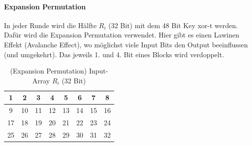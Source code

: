 \paragraph{Expansion Permutation}

In jeder Runde wird die Hälfte $R_i$ (32 Bit) mit dem 48 Bit Key xor-t werden. Dafür wird die Expansion Permutation  verwendet. Hier gibt
es einen Lawinen Effekt (Avalanche Effect), wo möglichst viele Input Bits den Output beeinflussen (und umgekehrt). Das jeweils 1. und 4. Bit eines Blocks wird verdoppelt.

\begin{table}[h]
    \centering
    \begin{tabular}{|*{8}{c|}}
        \hline
        \cellcolor{red-1}1 & \cellcolor{red-1}2 & \cellcolor{red-1}3 & \cellcolor{red-1}4 & 
        \cellcolor{red-1}5 & \cellcolor{red-1}6 & \cellcolor{red-1}7 & \cellcolor{red-1}8 \\
        \hline 
        \cellcolor{orange-1}9 & \cellcolor{orange-1}10 & \cellcolor{orange-1}11 & \cellcolor{orange-1}12 & 
        \cellcolor{orange-1}13 & \cellcolor{orange-1}14 & \cellcolor{orange-1}15 & \cellcolor{orange-1}16 \\
        \hline 
        \cellcolor{yellow-1}17 & \cellcolor{yellow-1}18 & \cellcolor{yellow-1}19 & \cellcolor{yellow-1}20 & 
        \cellcolor{yellow-1}21 & \cellcolor{yellow-1}22 & \cellcolor{yellow-1}23 & \cellcolor{yellow-1}24 \\
        \hline
        \cellcolor{green-1}25 & \cellcolor{green-1}26 & \cellcolor{green-1}27 & \cellcolor{green-1}28 &
        \cellcolor{green-1}29 & \cellcolor{green-1}30 & \cellcolor{green-1}31 & \cellcolor{green-1}32 \\
        \hline 
    \end{tabular}
    \caption{(Expansion Permutation) Input-Array $R_i$ (32 Bit)}
\end{table}

